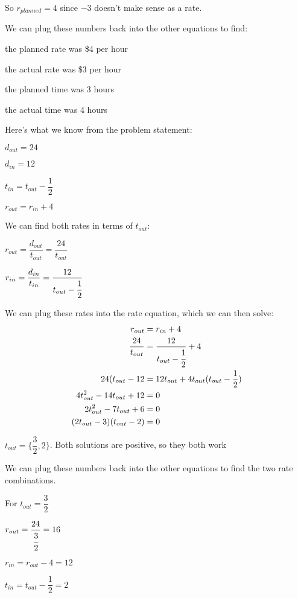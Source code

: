 \documentclass[fleqn,addpoints]{exam}
\begin{document}
\begin{description}
So $r_{planned} = 4$ since $-3$ doesn't make sense as a rate.

We can plug these numbers back into the other equations to find:
\begin{itemize*}
  \item the planned rate was \$4 per hour
  \item the actual rate was \$3 per hour
  \item the planned time was 3 hours
  \item the actual time was 4 hours
\end{itemize*}

\item[57]
Here's what we know from the problem statement:
\begin{itemize*}
  \item $d_{out} = 24$
  \item $d_{in} = 12$
  \item $t_{in} = t_{out} - \dfrac{1}{2}$
  \item $r_{out} = r_{in} + 4$
\end{itemize*}

We can find both rates in terms of $t_{out}$:
\begin{itemize*}
  \item $r_{out} = \dfrac{d_{out}}{t_{out}} = \dfrac{24}{t_{out}}  $
  \item $r_{in} = \dfrac{d_{in}}{t_{in}} = \dfrac{12}{t_{out} - \cfrac{1}{2}} $
\end{itemize*}

We can plug these rates into the rate equation, which we can then solve:
\begin{align*}
  r_{out} &= r_{in} + 4 \\
  \frac{24}{t_{out}} &= \frac{12}{t_{out} - \cfrac{1}{2}} + 4 \\
  24(t_{out} - 12 &= 12t_{out} + 4t_{out}(t_{out} - \frac{1}{2}) \\
  4t_{out}^2 - 14t_{out} + 12 &= 0 \\
  2t_{out}^2 - 7t_{out} + 6 &= 0 \\
  (2t_{out} - 3)(t_{out} - 2) &= 0 \\
\end{align*}

$t_{out} = \{\dfrac{3}{2}, 2\}$.  Both solutions are positive, so they both work

We can plug these numbers back into the other equations to find the two rate combinations.

For $t_{out} = \dfrac{3}{2}$
\begin{itemize*}
  \item $r_{out} = \dfrac{24}{\cfrac{3}{2}} = 16$
  \item $r_{in} = r_{out} - 4 = 12$
  \item $t_{in} = t_{out} - \dfrac{1}{2} = 2$
\end{itemize*}


\end{description}
\end{document}
